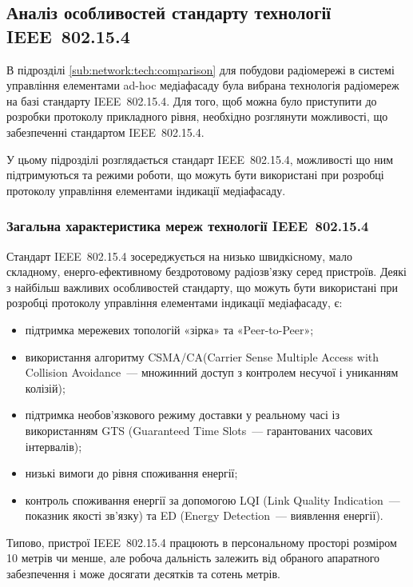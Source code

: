 \documentclass[a4paper,ukrainian,utf8,nocolumnsxix,floatsection,equationsection]{eskdtext}
\renewcommand\paragraph{\subsubsection}
\newcommand{\iee}[0]{IEEE~802.15.4\xspace}
\newcommand{\csma}[0]{CSMA/CA\xspace}
\newcommand{\engtxt}[1]{\foreignlanguage{english}{#1}}
\begin{document}

\subsection{Аналіз особливостей стандарту технології \iee}
\label{sub:ieee:standard:analysis}

В підрозділі \ref{sub:network:tech:comparison} для побудови радіомережі в системі управління елементами ad-hoc медіафасаду була вибрана технологія радіомереж на базі стандарту \iee. Для того, щоб можна було приступити до розробки протоколу прикладного рівня, необхідно розглянути можливості, що забезпеченні стандартом \iee.

У цьому підрозділі розглядається стандарт \iee, можливості що ним підтримуються та режими роботи, що можуть бути використані при розробці протоколу управління елементами індикації медіафасаду. 

\paragraph{Загальна характеристика мереж технології \iee}
\label{par:ieee:standard}


Стандарт \iee зосереджується на низько швидкісному, мало складному, енерго-ефективному бездротовому радіозв'язку серед пристроїв. Деякі з найбільш важливих особливостей стандарту, що можуть бути використані при розробці протоколу управління елементами індикації медіафасаду, є:
\begin{itemize}
	\item підтримка мережевих топологій «зірка» та «Peer-to-Peer»;
	\item використання алгоритму \csma (\engtxt{Carrier Sense Multiple Access with Collision Avoidance}~--- множинний доступ з контролем несучої і униканням колізій);
	\item підтримка необов'язкового режиму доставки у реальному часі із використанням GTS (Guaranteed Time Slots~--- гарантованих  часових інтервалів);
	\item низькі вимоги до рівня споживання енергії;
	\item контроль споживання енергії за допомогою LQI (Link Quality Indication~--- показник якості зв'язку) та ED (Energy Detection~--- виявлення енергії).
\end{itemize}

Типово, пристрої \iee працюють в персональному просторі розміром 10 метрів чи менше, але робоча дальність залежить від обраного апаратного забезпечення і може досягати десятків та сотень метрів.
\end{document}
